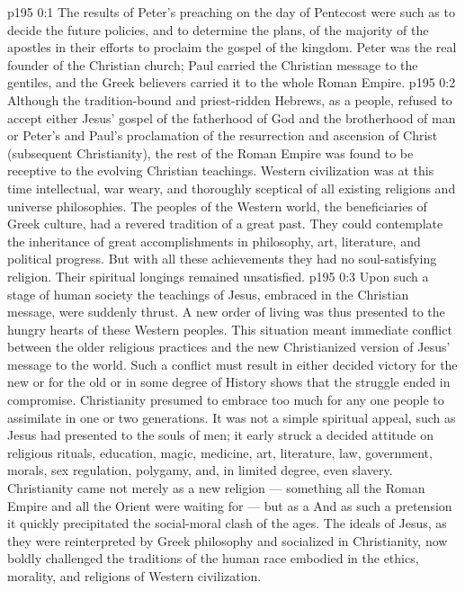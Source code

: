 \author{Midwayer Commission}
\vs p195 0:1 The results of Peter’s preaching on the day of Pentecost were such as to decide the future policies, and to determine the plans, of the majority of the apostles in their efforts to proclaim the gospel of the kingdom. Peter was the real founder of the Christian church; Paul carried the Christian message to the gentiles, and the Greek believers carried it to the whole Roman Empire.
\vs p195 0:2 Although the tradition\hyp{}bound and priest\hyp{}ridden Hebrews, as a people, refused to accept either Jesus’ gospel of the fatherhood of God and the brotherhood of man or Peter’s and Paul’s proclamation of the resurrection and ascension of Christ (subsequent Christianity), the rest of the Roman Empire was found to be receptive to the evolving Christian teachings. Western civilization was at this time intellectual, war weary, and thoroughly sceptical of all existing religions and universe philosophies. The peoples of the Western world, the beneficiaries of Greek culture, had a revered tradition of a great past. They could contemplate the inheritance of great accomplishments in philosophy, art, literature, and political progress. But with all these achievements they had no soul\hyp{}satisfying religion. Their spiritual longings remained unsatisfied.
\vs p195 0:3 Upon such a stage of human society the teachings of Jesus, embraced in the Christian message, were suddenly thrust. A new order of living was thus presented to the hungry hearts of these Western peoples. This situation meant immediate conflict between the older religious practices and the new Christianized version of Jesus’ message to the world. Such a conflict must result in either decided victory for the new or for the old or in some degree of  History shows that the struggle ended in compromise. Christianity presumed to embrace too much for any one people to assimilate in one or two generations. It was not a simple spiritual appeal, such as Jesus had presented to the souls of men; it early struck a decided attitude on religious rituals, education, magic, medicine, art, literature, law, government, morals, sex regulation, polygamy, and, in limited degree, even slavery. Christianity came not merely as a new religion --- something all the Roman Empire and all the Orient were waiting for --- but as a  And as such a pretension it quickly precipitated the social\hyp{}moral clash of the ages. The ideals of Jesus, as they were reinterpreted by Greek philosophy and socialized in Christianity, now boldly challenged the traditions of the human race embodied in the ethics, morality, and religions of Western civilization.
